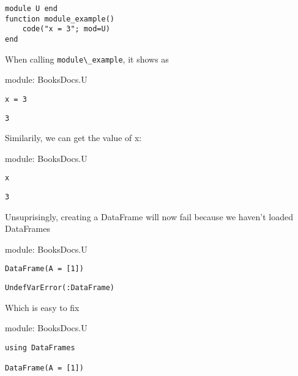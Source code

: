 \documentclass[
  14pt
  american,
  paper=a4,
  ,captions=tableheading
]{scrreprt}
\newcommand{\passthrough}[1]{#1}
\begin{document}
\begin{lstlisting}
module U end
function module_example()
    code("x = 3"; mod=U)
end
\end{lstlisting}

When calling \passthrough{\lstinline!module\_example!}, it shows as

\begin{flushright}
    \tiny
    module: BooksDocs.U
    \normalsize
\end{flushright}

\begin{lstlisting}
x = 3
\end{lstlisting}

\begin{lstlisting}
3
\end{lstlisting}

Similarily, we can get the value of x:

\begin{flushright}
    \tiny
    module: BooksDocs.U
    \normalsize
\end{flushright}

\begin{lstlisting}
x
\end{lstlisting}

\begin{lstlisting}
3
\end{lstlisting}

Unsuprisingly, creating a DataFrame will now fail because we haven't
loaded DataFrames

\begin{flushright}
    \tiny
    module: BooksDocs.U
    \normalsize
\end{flushright}

\begin{lstlisting}
DataFrame(A = [1])
\end{lstlisting}

\begin{lstlisting}
UndefVarError(:DataFrame)
\end{lstlisting}

Which is easy to fix

\begin{flushright}
    \tiny
    module: BooksDocs.U
    \normalsize
\end{flushright}

\begin{lstlisting}
using DataFrames 

DataFrame(A = [1])
\end{lstlisting}
\end{document}
